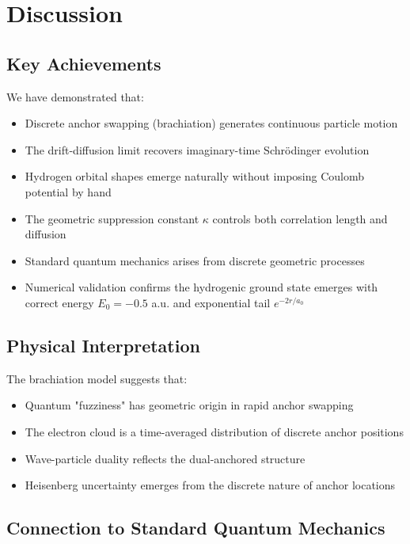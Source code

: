 \documentclass[11pt]{article}
\theoremstyle{plain}
\theoremstyle{definition}
\begin{document}
\section{Discussion}
\label{sec:discussion}

\subsection{Key Achievements}

We have demonstrated that:
\begin{itemize}
  \item Discrete anchor swapping (brachiation) generates continuous particle motion
  \item The drift-diffusion limit recovers imaginary-time Schrödinger evolution
  \item Hydrogen orbital shapes emerge naturally without imposing Coulomb potential by hand
  \item The geometric suppression constant $\kappa$ controls both correlation length and diffusion
  \item Standard quantum mechanics arises from discrete geometric processes
  \item Numerical validation confirms the hydrogenic ground state emerges with correct energy $E_0 = -0.5$ a.u. and exponential tail $e^{-2r/a_0}$
\end{itemize}

\subsection{Physical Interpretation}

The brachiation model suggests that:
\begin{itemize}
  \item Quantum "fuzziness" has geometric origin in rapid anchor swapping
  \item The electron cloud is a time-averaged distribution of discrete anchor positions
  \item Wave-particle duality reflects the dual-anchored structure
  \item Heisenberg uncertainty emerges from the discrete nature of anchor locations
\end{itemize}

\subsection{Connection to Standard Quantum Mechanics}
\end{document}
